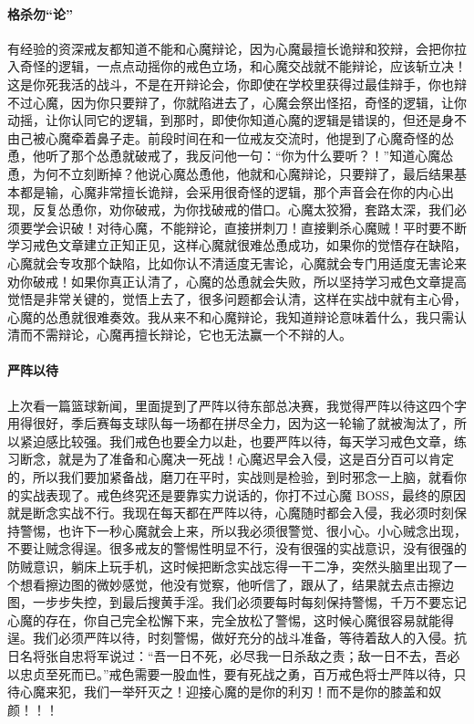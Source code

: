 \paragraph{格杀勿“论”}

有经验的资深戒友都知道不能和心魔辩论，因为心魔最擅长诡辩和狡辩，会把你拉入奇怪的逻辑，一点点动摇你的戒色立场，和心魔交战就不能辩论，应该斩立决！这是你死我活的战斗，不是在开辩论会，你即使在学校里获得过最佳辩手，你也辩不过心魔，因为你只要辩了，你就陷进去了，心魔会祭出怪招，奇怪的逻辑，让你动摇，让你认同它的逻辑，到那时，即使你知道心魔的逻辑是错误的，但还是身不由己被心魔牵着鼻子走。前段时间在和一位戒友交流时，他提到了心魔奇怪的怂恿，他听了那个怂恿就破戒了，我反问他一句：“你为什么要听？！”知道心魔怂恿，为何不立刻断掉？他说心魔怂恿他，他就和心魔辩论，只要辩了，最后结果基本都是输，心魔非常擅长诡辩，会采用很奇怪的逻辑，那个声音会在你的内心出现，反复怂恿你，劝你破戒，为你找破戒的借口。心魔太狡猾，套路太深，我们必须要学会识破！对待心魔，不能辩论，直接拼刺刀！直接剿杀心魔贼！平时要不断学习戒色文章建立正知正见，这样心魔就很难怂恿成功，如果你的觉悟存在缺陷，心魔就会专攻那个缺陷，比如你认不清适度无害论，心魔就会专门用适度无害论来劝你破戒！如果你真正认清了，心魔的怂恿就会失败，所以坚持学习戒色文章提高觉悟是非常关键的，觉悟上去了，很多问题都会认清，这样在实战中就有主心骨，心魔的怂恿就很难奏效。我从来不和心魔辩论，我知道辩论意味着什么，我只需认清而不需辩论，心魔再擅长辩论，它也无法赢一个不辩的人。

\paragraph{严阵以待}

上次看一篇篮球新闻，里面提到了严阵以待东部总决赛，我觉得严阵以待这四个字用得很好，季后赛每支球队每一场都在拼尽全力，因为这一轮输了就被淘汰了，所以紧迫感比较强。我们戒色也要全力以赴，也要严阵以待，每天学习戒色文章，练习断念，就是为了准备和心魔决一死战！心魔迟早会入侵，这是百分百可以肯定的，所以我们要加紧备战，磨刀在平时，实战则是检验，到时邪念一上脑，就看你的实战表现了。戒色终究还是要靠实力说话的，你打不过心魔 BOSS，最终的原因就是断念实战不行。我现在每天都在严阵以待，心魔随时都会入侵，我必须时刻保持警惕，也许下一秒心魔就会上来，所以我必须很警觉、很小心。小心贼念出现，不要让贼念得逞。很多戒友的警惕性明显不行，没有很强的实战意识，没有很强的防贼意识，躺床上玩手机，这时候把断念实战忘得一干二净，突然头脑里出现了一个想看擦边图的微妙感觉，他没有觉察，他听信了，跟从了，结果就去点击擦边图，一步步失控，到最后搜黄手淫。我们必须要每时每刻保持警惕，千万不要忘记心魔的存在，你自己完全松懈下来，完全放松了警惕，这时候心魔很容易就能得逞。我们必须严阵以待，时刻警惕，做好充分的战斗准备，等待着敌人的入侵。抗日名将张自忠将军说过：“吾一日不死，必尽我一日杀敌之责；敌一日不去，吾必以忠贞至死而已。”戒色需要一股血性，要有死战之勇，百万戒色将士严阵以待，只待心魔来犯，我们一举歼灭之！迎接心魔的是你的利刃！而不是你的膝盖和奴颜！！！

